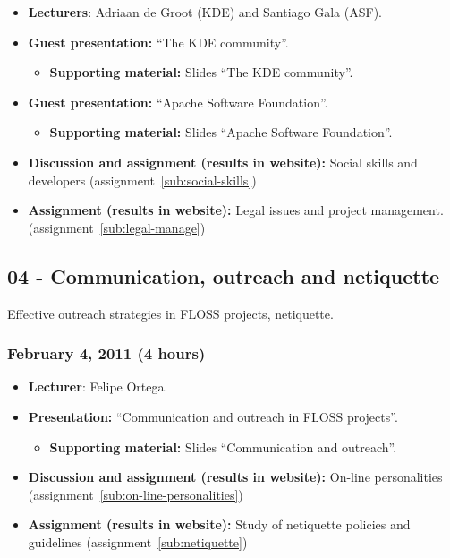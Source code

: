 \documentclass[a4paper]{article}
\begin{document}
\begin{itemize}
\item \textbf{Lecturers}: Adriaan de Groot (KDE) and Santiago Gala (ASF).
\item \textbf{Guest presentation:} ``The KDE community''.
  \begin{itemize}
  \item \textbf{Supporting material:} Slides ``The KDE community''.
  \end{itemize}
\item \textbf{Guest presentation:} ``Apache Software Foundation''.
  \begin{itemize}
  \item \textbf{Supporting material:} Slides ``Apache Software Foundation''.
  \end{itemize}
\item \textbf{Discussion and assignment (results in website):} Social skills and developers (assignment~\ref{sub:social-skills})
\item \textbf{Assignment (results in website):} Legal issues and project management. (assignment~\ref{sub:legal-manage})
\end{itemize}

\subsection{04 - Communication, outreach and netiquette}

Effective outreach strategies in FLOSS projects, netiquette.

\subsubsection{February 4, 2011 (4 hours)}

\begin{itemize}
\item \textbf{Lecturer}: Felipe Ortega.
\item \textbf{Presentation:} ``Communication and outreach in FLOSS projects''.
  \begin{itemize}
  \item \textbf{Supporting material:} Slides ``Communication and outreach''.
  \end{itemize}
\item \textbf{Discussion and assignment (results in website):} On-line personalities (assignment~\ref{sub:on-line-personalities})
\item \textbf{Assignment (results in website):} Study of netiquette policies and guidelines (assignment~\ref{sub:netiquette})
\end{itemize}
\end{document}
